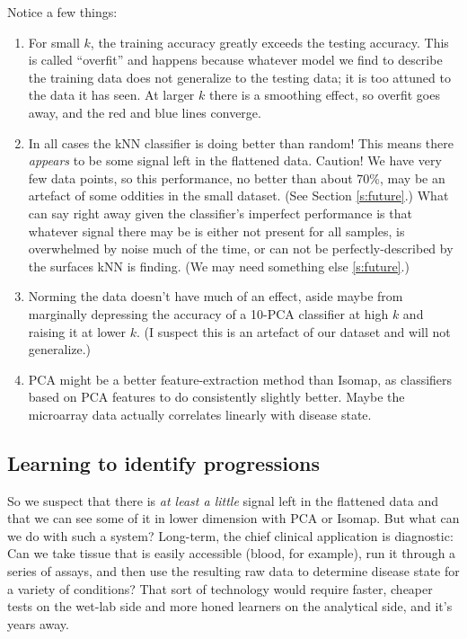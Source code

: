 \documentclass[]{article}
\begin{document}
  Notice a few things:

  \begin{enumerate}
    \item For small $k$, the training accuracy greatly exceeds the testing accuracy. This is called ``overfit'' and happens because whatever model we find to describe the training data does not generalize to the testing data; it is too attuned to the data it has seen. At larger $k$ there is a smoothing effect, so overfit goes away, and the red and blue lines converge.

    \item In all cases the kNN classifier is doing better than random! This means there \textit{appears} to be some signal left in the flattened data. Caution! We have very few data points, so this performance, no better than about 70\%, may be an artefact of some oddities in the small dataset. (See Section \ref{s:future}.) What can say right away given the classifier's imperfect performance is that whatever signal there may be is either not present for all samples, is overwhelmed by noise much of the time, or can not be perfectly-described by the surfaces kNN is finding. (We may need something else \ref{s:future}.)

    \item Norming the data doesn't have much of an effect, aside maybe from marginally depressing the accuracy of a 10-PCA classifier at high $k$ and raising it at lower $k$. (I suspect this is an artefact of our dataset and will not generalize.)

    \item PCA might be a better feature-extraction method than Isomap, as classifiers based on PCA features to do consistently slightly better. Maybe the microarray data actually correlates linearly with disease state.
  \end{enumerate}

  \subsection{Learning to identify progressions}

  So we suspect that there is \textit{at least a little} signal left in the flattened data and that we can see some of it in lower dimension with PCA or Isomap. But what can we do with such a system? Long-term, the chief clinical application is diagnostic: Can we take tissue that is easily accessible (blood, for example), run it through a series of assays, and then use the resulting raw data to determine disease state for a variety of conditions? That sort of technology would require faster, cheaper tests on the wet-lab side and more honed learners on the analytical side, and it's years away.
\end{document}
